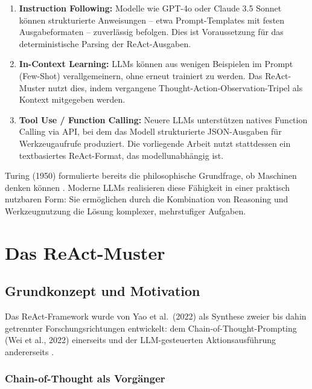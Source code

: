 \documentclass[12pt,a4paper,oneside]{report}
\begin{document}
\begin{enumerate}
  \item \textbf{Instruction Following:} Modelle wie GPT-4o oder Claude 3.5 Sonnet
    können strukturierte Anweisungen -- etwa Prompt-Templates mit festen Ausgabeformaten
    -- zuverlässig befolgen. Dies ist Voraussetzung für das deterministische Parsing der
    ReAct-Ausgaben.

  \item \textbf{In-Context Learning:} \ac{LLM}s können aus wenigen Beispielen im
    Prompt (Few-Shot) verallgemeinern, ohne erneut trainiert zu werden. Das ReAct-Muster
    nutzt dies, indem vergangene Thought-Action-Observation-Tripel als Kontext mitgegeben
    werden.

  \item \textbf{Tool Use / Function Calling:} Neuere \ac{LLM}s unterstützen natives
    Function Calling via \ac{API}, bei dem das Modell strukturierte JSON-Ausgaben für
    Werkzeugaufrufe produziert. Die vorliegende Arbeit nutzt stattdessen ein
    textbasiertes ReAct-Format, das modellunabhängig ist.
\end{enumerate}

Turing (1950) formulierte bereits die philosophische Grundfrage, ob Maschinen denken
können \cite{turing1950computing}. Moderne \ac{LLM}s realisieren diese Fähigkeit in
einer praktisch nutzbaren Form: Sie ermöglichen durch die Kombination von Reasoning
und Werkzeugnutzung die Lösung komplexer, mehrstufiger Aufgaben.

\section{Das ReAct-Muster}
\label{sec:react}

\subsection{Grundkonzept und Motivation}

Das ReAct-Framework wurde von Yao et al.\ (2022) als Synthese zweier bis dahin
getrennter Forschungsrichtungen entwickelt: dem Chain-of-Thought-Prompting (Wei et al.,
2022) einerseits und der LLM-gesteuerten Aktionsausführung andererseits \cite{yao2022react}.

\subsubsection{Chain-of-Thought als Vorgänger}
\end{document}
